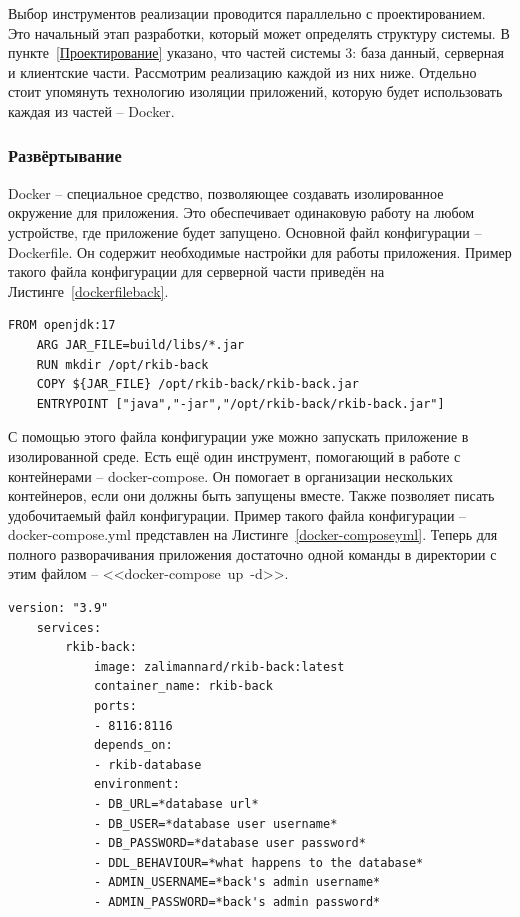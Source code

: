 \documentclass[a4paper,article]{article}
\begin{document}
\begin{sloppypar}
    Выбор инструментов реализации проводится параллельно с проектированием. Это начальный этап разработки, который может определять структуру системы. В пункте~\ref{Проектирование} указано, что частей системы 3: база данный, серверная и клиентские части. Рассмотрим реализацию каждой из них ниже. Отдельно стоит упомянуть технологию изоляции приложений, которую будет использовать каждая из частей -- Docker.

    \subsubsection{Развёртывание}\label{Реализация. Выбор. Докер}

    Docker -- специальное средство, позволяющее создавать изолированное окружение для приложения. Это обеспечивает одинаковую работу на любом устройстве, где приложение будет запущено. Основной файл конфигурации -- Dockerfile. Он содержит необходимые настройки для работы приложения. Пример такого файла конфигурации для серверной части приведён на Листинге~\ref{dockerfileback}.

    \begin{lstlisting}[label=dockerfileback,caption=Пример Dockerfile для бекенда]
    FROM openjdk:17
    ARG JAR_FILE=build/libs/*.jar
    RUN mkdir /opt/rkib-back
    COPY ${JAR_FILE} /opt/rkib-back/rkib-back.jar
    ENTRYPOINT ["java","-jar","/opt/rkib-back/rkib-back.jar"]
    \end{lstlisting}

    С помощью этого файла конфигурации уже можно запускать приложение в изолированной среде. Есть ещё один инструмент, помогающий в работе с контейнерами -- docker-compose. Он помогает в организации нескольких контейнеров, если они должны быть запущены вместе. Также позволяет писать удобочитаемый файл конфигурации. Пример такого файла конфигурации -- docker-compose.yml представлен на Листинге~\ref{docker-composeyml}. Теперь для полного разворачивания приложения достаточно одной команды в директории с этим файлом -- <<docker-compose~up~-d>>.

    \begin{lstlisting}[label=docker-composeyml,caption=Пример файла конфигурации docker-compose.yml]
    version: "3.9"
    services:
        rkib-back:
            image: zalimannard/rkib-back:latest
            container_name: rkib-back
            ports:
            - 8116:8116
            depends_on:
            - rkib-database
            environment:
            - DB_URL=*database url*
            - DB_USER=*database user username*
            - DB_PASSWORD=*database user password*
            - DDL_BEHAVIOUR=*what happens to the database*
            - ADMIN_USERNAME=*back's admin username*
            - ADMIN_PASSWORD=*back's admin password*
    \end{lstlisting}


\end{sloppypar}
\end{document}
